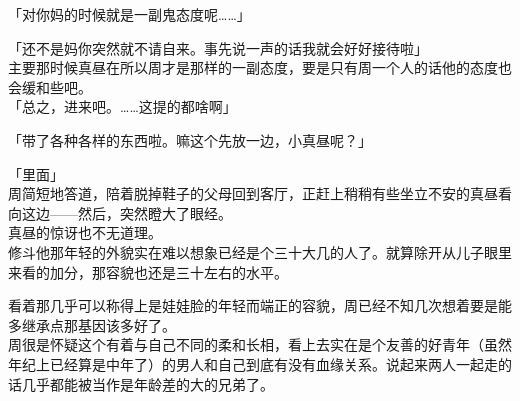 「对你妈的时候就是一副鬼态度呢……」

「还不是妈你突然就不请自来。事先说一声的话我就会好好接待啦」\\

主要那时候真昼在所以周才是那样的一副态度，要是只有周一个人的话他的态度也会缓和些吧。\\

「总之，进来吧。……这提的都啥啊」

「带了各种各样的东西啦。嘛这个先放一边，小真昼呢？」

「里面」\\

周简短地答道，陪着脱掉鞋子的父母回到客厅，正赶上稍稍有些坐立不安的真昼看向这边——然后，突然瞪大了眼经。\\

真昼的惊讶也不无道理。\\

修斗他那年轻的外貌实在难以想象已经是个三十大几的人了。就算除开从儿子眼里来看的加分，那容貌也还是三十左右的水平。

看着那几乎可以称得上是娃娃脸的年轻而端正的容貌，周已经不知几次想着要是能多继承点那基因该多好了。\\

周很是怀疑这个有着与自己不同的柔和长相，看上去实在是个友善的好青年（虽然年纪上已经算是中年了）的男人和自己到底有没有血缘关系。说起来两人一起走的话几乎都能被当作是年龄差的大的兄弟了。\\

